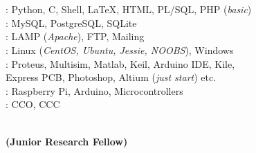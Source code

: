 \documentclass[a4paper,11pt]{memoir} %
\begin{document}
\begin{minipage}[t]{0.25\columnwidth}
 \\
 \\
 \\
\\
 \\
\quad \\
\\

\end{minipage}
\hfill
\begin{minipage}[t]{0.75\columnwidth}
: Python, C, Shell, \LaTeX, HTML, PL/SQL, PHP (\textit{basic})\\
: MySQL, PostgreSQL, SQLite \\ 
: LAMP (\textit{Apache}), FTP, Mailing \\
: Linux (\textit{CentOS, Ubuntu, Jessie, NOOBS}), Windows\\
: Proteus, Multisim, Matlab, Keil, Arduino IDE, Kile,\\ \phantom{.} %
Express PCB, Photoshop, Altium (\textit{just start}) etc.\\
: Raspberry Pi, Arduino, Microcontrollers\\ 
: CCO, CCC
\end{minipage}
\vspace{.5cm}

\Sep %


\begin{minipage}[t]{0.25\columnwidth}
\end{minipage}
\hfill
\begin{minipage}[t]{0.75\columnwidth}
\begin{center}
\\
\textbf{(Junior Research Fellow)}  
\end{center}
\end{minipage}
\end{document}
